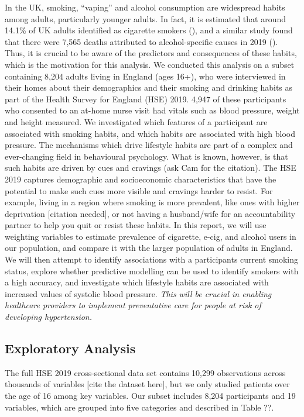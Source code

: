 \documentclass[
  11pt,
]{article}
\begin{document}
In the UK, smoking, ``vaping'' and alcohol consumption are widespread
habits among adults, particularly younger adults. In fact, it is
estimated that around 14.1\% of UK adults identified as cigarette
smokers (), and a similar study found that
there were 7,565 deaths attributed to alcohol-specific causes in 2019
(). Thus, it is crucial to be aware of the
predictors and consequences of these habits, which is the motivation for
this analysis. We conducted this analysis on a subset containing 8,204
adults living in England (ages 16+), who were interviewed in their homes
about their demographics and their smoking and drinking habits as part
of the Health Survey for England (HSE) 2019. 4,947 of these participants
who consented to an at-home nurse visit had vitals such as blood
pressure, weight and height measured. We investigated which features of
a participant are associated with smoking habits, and which habits are
associated with high blood pressure. The mechanisms which drive
lifestyle habits are part of a complex and ever-changing field in
behavioural psychology. What is known, however, is that such habits are
driven by cues and cravings (ask Cam for the citation). The HSE 2019
captures demographic and socioeconomic characteristics that have the
potential to make such cues more visible and cravings harder to resist.
For example, living in a region where smoking is more prevalent, like
ones with higher deprivation {[}citation needed{]}, or not having a
husband/wife for an accountability partner to help you quit or resist
these habits. In this report, we will use weighting variables to
estimate prevalence of cigarette, e-cig, and alcohol users in our
population, and compare it with the larger population of adults in
England. We will then attempt to identify associations with a
participants current smoking status, explore whether predictive
modelling can be used to identify smokers with a high accuracy, and
investigate which lifestyle habits are associated with increased values
of systolic blood pressure. \emph{This will be crucial in enabling
healthcare providers to implement preventative care for people at risk
of developing hypertension.}

\subsection{Exploratory Analysis}\label{exploratory-analysis}

The full HSE 2019 cross-sectional data set contains 10,299 observations
across thousands of variables {[}cite the dataset here{]}, but we only
studied patients over the age of 16 among key variables. Our subset
includes 8,204 participants and 19 variables, which are grouped into
five categories and described in Table ??.
\end{document}
